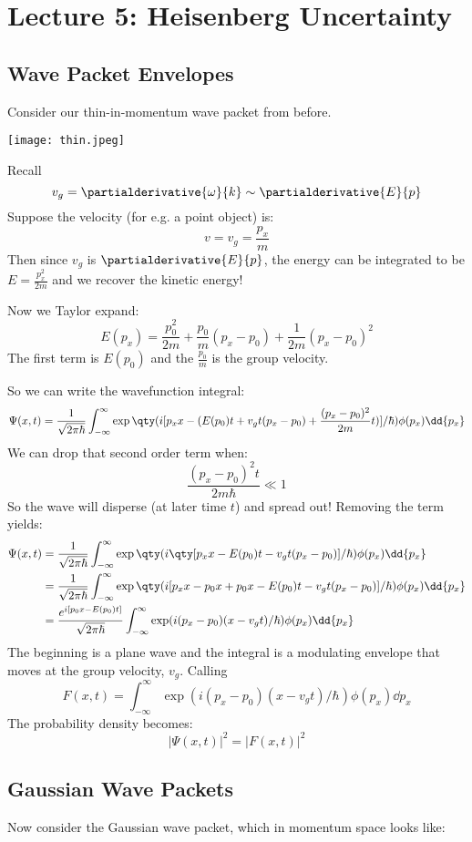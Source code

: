 \section{Lecture 5: Heisenberg Uncertainty}

\subsection{Wave Packet Envelopes}
Consider our thin-in-momentum wave packet from before.

\texttt{[image: thin.jpeg]}

Recall
\[ v_g = \partialderivative{\omega}{k} \sim \partialderivative{E}{p} \]
Suppose the velocity (for e.g. a point object) is:
\[ v = v_g = \frac{p_x}{m} \]
Then since $v_g$ is $\partialderivative{E}{p}$, the energy can be integrated to be $E = \frac{p_x^2}{2m}$ and we recover the
kinetic energy!

Now we Taylor expand:
\[ E(p_x) = \frac{p_0^2}{2m} + \frac{p_0}{m} (p_x - p_0) + \frac{1}{2m} (p_x - p_0)^2 \]
The first term is $E(p_0)$ and the $\frac{p_0}{m}$ is the group velocity.

So we can write the wavefunction integral:
\[ \Psi(x, t) = \frac{1}{\sqrt{2\pi \hbar}} \int_{-\infty}^{\infty} \exp\qty(i[p_x x - (E(p_0)t + v_gt(p_x - p_0) + \frac{(p_x - p_0)^2}{2m}t)]/\hbar) \phi(p_x) \dd{p_x} \]
We can drop that second order term when:
\[ \frac{(p_x - p_0)^2 t}{2m \hbar} \ll 1 \]
So the wave will disperse (at later time $t$) and spread out! Removing the term yields:
\begin{align*}
    \Psi(x, t) &= \frac{1}{\sqrt{2\pi \hbar}} \int_{-\infty}^{\infty} \exp\qty(i\qty[p_x x - E(p_0)t - v_gt(p_x - p_0)]/\hbar) \phi(p_x) \dd{p_x} \\
    &= \frac{1}{\sqrt{2\pi \hbar}} \int_{-\infty}^{\infty} \exp\qty(i[p_x x - p_0 x + p_0 x - E(p_0)t - v_gt(p_x - p_0)]/\hbar) \phi(p_x) \dd{p_x} \\
    &= \frac{e^{i[p_0 x - E(p_0)t]}}{\sqrt{2\pi \hbar}} \int_{-\infty}^{\infty} \exp(i (p_x - p_0)(x - v_g t)/\hbar) \phi(p_x) \dd{p_x} \\
\end{align*}
The beginning is a plane wave and the integral is a modulating envelope that moves at the group velocity, $v_g$.
Calling
\[F(x, t) = \int_{-\infty}^{\infty} \exp(i (p_x - p_0)(x - v_g t)/\hbar) \phi(p_x) \dd{p_x} \]
The probability density becomes:
\[ |\Psi(x, t)|^2 = |F(x, t)|^2 \]

\subsection{Gaussian Wave Packets}
Now consider the Gaussian wave packet, which in momentum space looks like:



